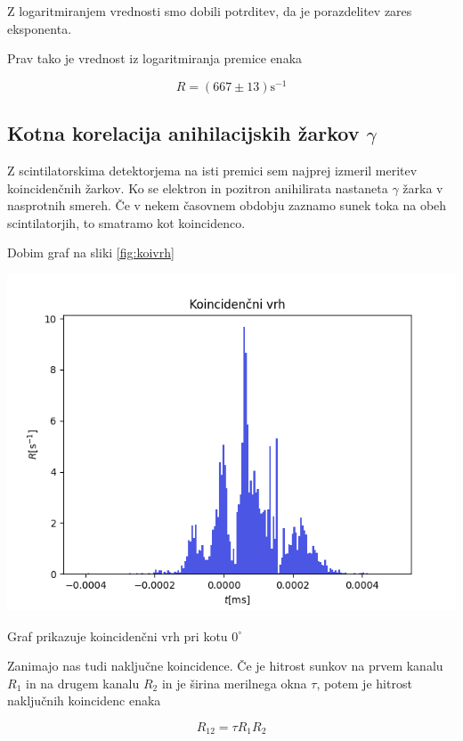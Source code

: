 \documentclass[11pt]{article}
\begin{document}
Z logaritmiranjem vrednosti smo dobili potrditev, da je porazdelitev zares eksponenta.

Prav tako je vrednost iz logaritmiranja premice enaka

\[ R = (667 \pm 13) \mathrm{s}^{-1}
\]

\subsection{Kotna korelacija anihilacijskih žarkov $\gamma$}\label{sec:orgbb3588f}

Z scintilatorskima detektorjema na isti premici sem najprej izmeril meritev koincidenčnih žarkov. Ko se elektron in pozitron anihilirata nastaneta \(\gamma\) žarka v nasprotnih smereh. Če v nekem časovnem obdobju zaznamo sunek toka na obeh scintilatorjih, to smatramo kot koincidenco.

Dobim graf na sliki \ref{fig:koivrh}

\begin{slika}[H]
  \centering
  \includegraphics[width=.9\linewidth]{figures/koincidencni_vrh.png}
  \caption{\small Graf prikazuje koincidenčni vrh pri kotu $0^{\circ}$}\label{fig:koivrh}
\end{slika}

Zanimajo nas tudi naključne koincidence. Če je hitrost sunkov na prvem kanalu \(R_1\) in na drugem kanalu \(R_2\) in je širina merilnega okna \(\tau\), potem je hitrost naključnih koincidenc enaka

\begin{equation}
\label{eq:3}
R_{12} = \tau R_1 R_2
\end{equation}
\end{document}

